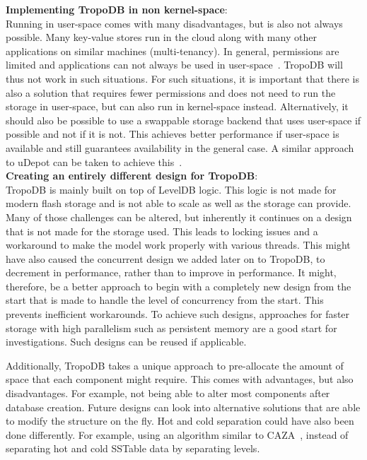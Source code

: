 \textbf{Implementing TropoDB in non kernel-space}:\\
Running in user-space comes with many disadvantages, but is also not always possible. Many key-value stores run in the cloud along with many other applications on similar machines (multi-tenancy). In general, permissions are limited and applications can not always be used in user-space~\cite{kourtis2019reaping}. TropoDB will thus not work in such situations. For such situations, it is important that there is also a solution that requires fewer permissions and does not need to run the storage in user-space, but can also run in kernel-space instead. Alternatively, it should also be possible to use a swappable storage backend that uses user-space if possible and not if it is not. This achieves better performance if user-space is available and still guarantees availability in the general case. A similar approach to uDepot can be taken to achieve this~\cite{kourtis2019reaping}.\\
\textbf{Creating an entirely different design for TropoDB}:\\
TropoDB is mainly built on top of LevelDB logic. This logic is not made for modern flash storage and is not able to scale as well as the storage can provide. Many of those challenges can be altered, but inherently it continues on a design that is not made for the storage used. This leads to locking issues and a workaround to make the model work properly with various threads. This might have also caused the concurrent design we added later on to TropoDB, to decrement in performance, rather than to improve in performance. It might, therefore, be a better approach to begin with a completely new design from the start that is made to handle the level of concurrency from the start. This prevents inefficient workarounds. To achieve such designs, approaches for faster storage with high parallelism such as persistent memory are a good start for investigations. Such designs can be reused if applicable.

Additionally, TropoDB takes a unique approach to pre-allocate the amount of space that each component might require. This comes with advantages, but also disadvantages. For example, not being able to alter most components after database creation. Future designs can look into alternative solutions that are able to modify the structure on the fly. Hot and cold separation could have also been done differently. For example, using an algorithm similar to CAZA~\cite{lee2022compaction}, instead of separating hot and cold SSTable data by separating levels.
